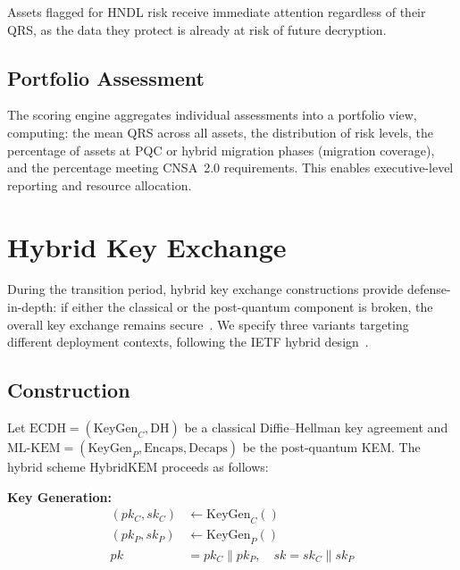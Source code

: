 \documentclass[conference,10pt]{IEEEtran}
\begin{document}
\noindent Assets flagged for HNDL risk receive immediate attention
regardless of their QRS, as the data they protect is already at risk
of future decryption.

\subsection{Portfolio Assessment}

The scoring engine aggregates individual assessments into a portfolio
view, computing: the mean QRS across all assets, the distribution of
risk levels, the percentage of assets at PQC or hybrid migration phases
(migration coverage), and the percentage meeting CNSA~2.0 requirements.
This enables executive-level reporting and resource allocation.

\section{Hybrid Key Exchange}\label{sec:hybrid}

During the transition period, hybrid key exchange constructions provide
defense-in-depth: if either the classical or the post-quantum component
is broken, the overall key exchange remains secure~\cite{giacon2018,
dowling2020}. We specify three variants targeting different deployment
contexts, following the IETF hybrid design~\cite{draft-hybrid-design}.

\subsection{Construction}

Let $\text{ECDH} = (\text{KeyGen}_C, \text{DH})$ be a classical
Diffie--Hellman key agreement and $\text{ML-KEM} = (\text{KeyGen}_P,
\text{Encaps}, \text{Decaps})$ be the post-quantum KEM. The hybrid
scheme $\text{HybridKEM}$ proceeds as follows:

\vspace{0.5em}
\noindent\textbf{Key Generation:}
\begin{align}
  (pk_C, sk_C) &\leftarrow \text{KeyGen}_C() \\
  (pk_P, sk_P) &\leftarrow \text{KeyGen}_P() \\
  pk &= pk_C \| pk_P,\quad sk = sk_C \| sk_P
\end{align}
\end{document}
